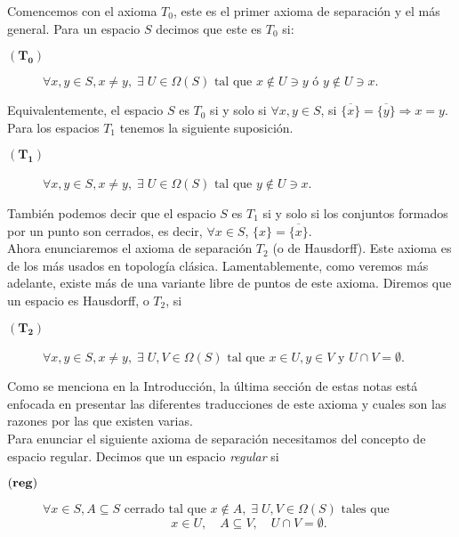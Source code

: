 \documentclass{comunicaciones}
\begin{document}
Comencemos con el axioma \textbf{$T_0$}, este es el primer axioma de separación y el más general. Para un espacio $S$ decimos que este es $T_0$ si:

\begin{description}
\item[$(\mathbf{T_0})$] $\forall x, y\in S, x\neq y,\; \exists\; U\in \Omega (S) \mbox{ tal que } x\notin U \ni y \mbox{ ó } y\notin U \ni x.$
\end{description}

Equivalentemente, el espacio $S$ es $T_0$ si y solo si $\forall x,y\in S$, si $\overline{\{x\}}=\overline{\{y\}}\Rightarrow x=y$.\\

Para los espacios $T_1$ tenemos la siguiente suposición. 

\begin{description}
\item[$(\mathbf{T_1})$] $\forall x, y\in S, x\neq y,\; \exists\; U\in \Omega (S) \mbox{ tal que } y\notin U \ni x$.
\end{description}

También podemos decir que el espacio $S$ es $T_1$ si y solo si los conjuntos formados por un punto son cerrados, es decir, $\forall x\in S$, $\{x\}=\overline{\{x\}}$.\\

Ahora enunciaremos el axioma de separación $T_2$ (o de Hausdorff). Este axioma es de los más usados en topología clásica. Lamentablemente, como veremos más adelante, existe más de una variante libre de puntos de este axioma. Diremos que un espacio es Hausdorff, o $T_2$, si

\begin{description}
\item[$(\mathbf{T_2})$] $\forall x, y\in S, x\neq y,\; \exists\; U, V\in \Omega (S) \mbox{ tal que } x\in U, y\in V \mbox{ y } U\cap V=\emptyset$.
\end{description}
Como se menciona en la Introducción, la última sección de estas notas está enfocada en presentar las diferentes traducciones de este axioma y cuales son las razones por las que existen varias.\\


Para enunciar el siguiente axioma de separación necesitamos del concepto de espacio regular. Decimos que un espacio \emph{regular} si

\begin{description}
\item[$(\mbox{\textbf{reg}})$] $\forall x\in S, A\subseteq S \mbox{ cerrado tal que }x\notin A,\; \exists\; U, V\in \Omega (S) \mbox{ tales que }$
\[
x\in U,\quad A\subseteq V, \quad U\cap V=\emptyset.
\]
\end{description}
\end{document}
